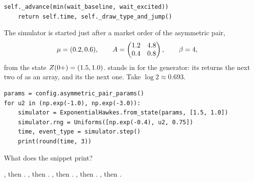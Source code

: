 \begin{question}
\begin{lstlisting}[caption={\protect\codehl{unito26.lob.hawkes.ExponentialHawkes.step}, its comments elided.}, label=listing.exactWaitStep]
    self._advance(min(wait_baseline, wait_excited))
    return self.time, self._draw_type_and_jump()
\end{lstlisting}
The simulator is started just after a market order of the asymmetric pair,
\begin{equation*}
 \mu = (0.2, 0.6),
 \qquad
 A = \begin{pmatrix} 1.2 & 4.8 \\ 0.4 & 0.8 \end{pmatrix},
 \qquad
 \beta = 4,
\end{equation*}
from the state $Z(0+) = (1.5, 1.0)$.
 stands in for the generator:
its  returns the next two of  as an array,
and its  the next one.
Take $\log 2 \approx 0.693$.
\begin{lstlisting}[caption={One step on given uniforms, in two cases}, label=listing.exactWaitRun]
params = config.asymmetric_pair_params()
for u2 in (np.exp(-1.0), np.exp(-3.0)):
    simulator = ExponentialHawkes.from_state(params, [1.5, 1.0])
    simulator.rng = Uniforms([np.exp(-0.4), u2, 0.75])
    time, event_type = simulator.step()
    print(round(time, 3))
\end{lstlisting}
What does the snippet print?
\begin{choices}
 \choice {}, then .
 \choice {}, then .
 \choice {}, then .
 \correctchoice {}, then .
 \choice {}, then .
\end{choices}
\end{question}

